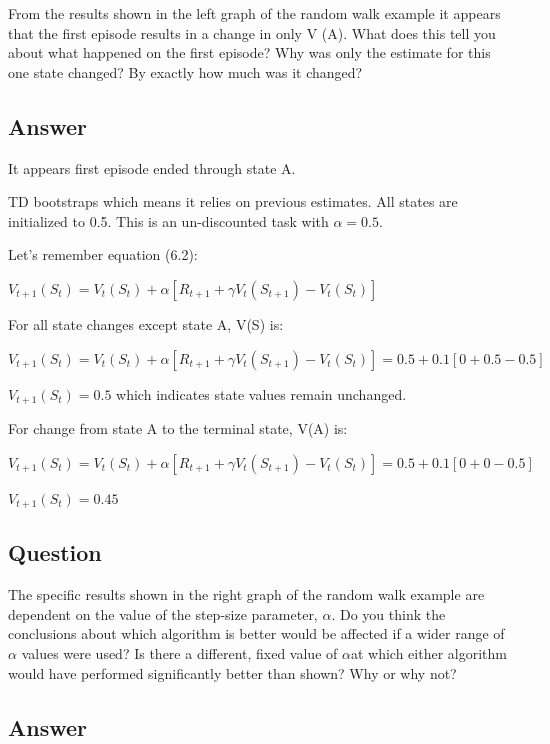 \documentclass[11pt]{article}
\begin{document}
    From the results shown in the left graph of the random walk example it appears that the first episode results in a change in only V (A).
    What does this tell you about what happened on the first episode?
    Why was only the estimate for this one state changed?
    By exactly how much was it changed?

    \subsection*{Answer}

    It appears first episode ended through state A\@.

    TD bootstraps which means it relies on previous estimates.
    All states are initialized to 0.5.
    This is an un-discounted task with $\alpha=0.5$.

    Let's remember equation (6.2):

    $V_{t+1}(S_t) = V_t(S_t) + \alpha [ R_{t+1} + \gamma V_t(S_{t+1}) -V_t(S_t) ]$
    \newline

    For all state changes except state A, V(S) is:

    $V_{t+1}(S_t) = V_t(S_t) + \alpha [ R_{t+1} + \gamma V_t(S_{t+1}) -V_t(S_t) ] = 0.5 + 0.1 [0 + 0.5 - 0.5] $

    $V_{t+1}(S_t) = 0.5 $ which indicates state values remain unchanged.
    \newline

    For change from state A to the terminal state, V(A) is:

    $V_{t+1}(S_t) = V_t(S_t) + \alpha [ R_{t+1} + \gamma V_t(S_{t+1}) -V_t(S_t) ] = 0.5 + 0.1 [0 + 0 - 0.5] $

    $V_{t+1}(S_t) = 0.45 $


    \subsection{Question}

    The specific results shown in the right graph of the random walk example are dependent on the value of the step-size parameter, $\alpha$.
    Do you think the conclusions about which algorithm is better would be affected if a wider range of $\alpha$ values were used?
    Is there a different, fixed value of $\alpha$at which either algorithm would have performed significantly better than shown?
    Why or why not?

    \subsection*{Answer}
\end{document}
